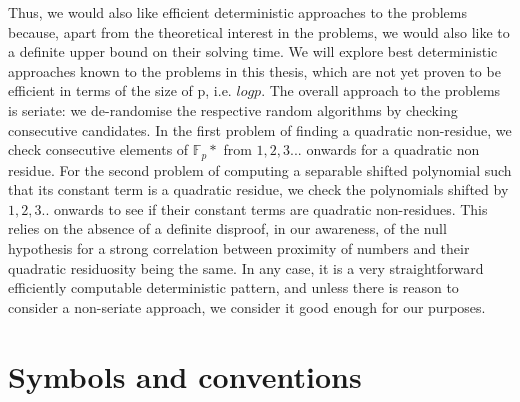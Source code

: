 \documentclass{report}
\begin{document}
Thus, we would also like efficient deterministic approaches to the problems because, apart from the theoretical interest in the problems, we would also like to a definite upper bound on their solving time. We will explore best deterministic approaches known to the problems in this thesis, which are not yet proven to be efficient in terms of the size of p, i.e. $log p$. The overall approach to the problems is seriate: we de-randomise the respective random algorithms by checking consecutive candidates. In the first problem of finding a quadratic non-residue, we check consecutive elements of $\mathbb{F}_p*$ from $1,2,3...$ onwards for a quadratic non residue. For the second problem of computing a separable shifted polynomial such that its constant term is a quadratic residue, we check the polynomials shifted by $1,2,3..$ onwards to see if their constant terms are quadratic non-residues. This relies on the absence of a definite disproof, in our awareness, of the null hypothesis for a strong correlation between proximity of numbers and their quadratic residuosity being the same. In any case, it is a very straightforward efficiently computable deterministic pattern, and unless there is reason to consider a non-seriate approach, we consider it good enough for our purposes.

\section{Symbols and conventions}


%
%
%
\end{document}
